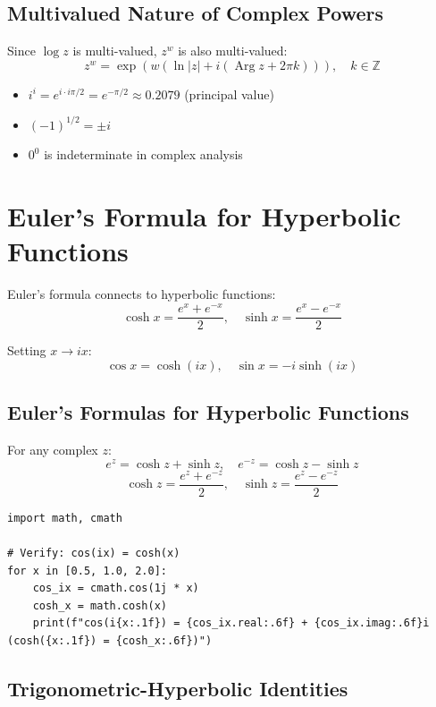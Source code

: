 \subsection{Multivalued Nature of Complex Powers}

Since $\log z$ is multi-valued, $z^w$ is also multi-valued:
\[
z^w = \exp(w(\ln|z| + i(\operatorname{Arg} z + 2\pi k))), \quad k \in \mathbb{Z}
\]

\begin{example}
\begin{itemize}
\item $i^i = e^{i \cdot i\pi/2} = e^{-\pi/2} \approx 0.2079$ (principal value)
\item $(-1)^{1/2} = \pm i$
\item $0^0$ is indeterminate in complex analysis
\end{itemize}
\end{example}

\section{Euler's Formula for Hyperbolic Functions}

Euler's formula connects to hyperbolic functions:
\[
\cosh x = \frac{e^x + e^{-x}}{2}, \quad \sinh x = \frac{e^x - e^{-x}}{2}
\]

Setting $x \to ix$:
\[
\cos x = \cosh(ix), \quad \sin x = -i \sinh(ix)
\]

\subsection{Euler's Formulas for Hyperbolic Functions}

\begin{theorem}
For any complex $z$:
\[
e^z = \cosh z + \sinh z, \quad e^{-z} = \cosh z - \sinh z
\]
\[
\cosh z = \frac{e^z + e^{-z}}{2}, \quad \sinh z = \frac{e^z - e^{-z}}{2}
\]
\end{theorem}

\begin{lstlisting}[caption={Hyperbolic identities}, label=lst:hyperbolic]
import math, cmath

# Verify: cos(ix) = cosh(x)
for x in [0.5, 1.0, 2.0]:
    cos_ix = cmath.cos(1j * x)
    cosh_x = math.cosh(x)
    print(f"cos(i{x:.1f}) = {cos_ix.real:.6f} + {cos_ix.imag:.6f}i  (cosh({x:.1f}) = {cosh_x:.6f})")
\end{lstlisting}

\subsection{Trigonometric-Hyperbolic Identities}

